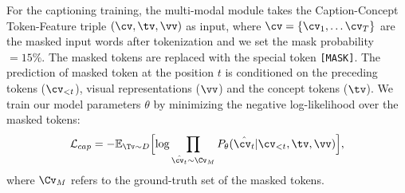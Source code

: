 
For the captioning training, the multi-modal module takes the Caption-Concept Token-Feature triple $(\cv, \tv, \vv)$ as input, 
where $\cv = \{\cv_1, \dots \cv_T\}$ are the masked input words after tokenization and we set the mask probability $=15\%$. The masked tokens are replaced with the special token \texttt{[MASK]}.
The prediction of masked token at the position $t$ is conditioned on the preceding tokens ($\cv_{<t}$), visual representations ($\vv$) and the concept tokens ($\tv$). We train our model parameters $\theta$ by minimizing the negative log-likelihood over the masked tokens:
\begin{equation}
    \mathcal{L}_{cap} = -\mathbb{E}_{\Tv\sim D}\Big[\text{log}\prod_{\hat{\cv_{t}}\sim \Cv_{M}} P_{\theta}(\hat{\cv_{t}}|\cv_{<t}, \tv, \vv)\Big],
\end{equation}
where $\Cv_{M}$ refers to the ground-truth set of the masked tokens.

